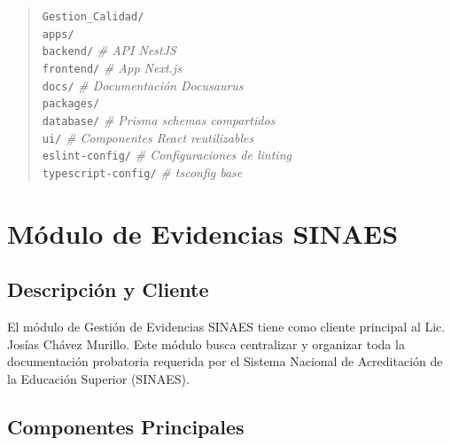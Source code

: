 \begin{quote}
\texttt{Gestion\_Calidad/}\\
\hspace*{1em}\texttt{apps/}\\
\hspace*{2em}\texttt{backend/} \hspace{2em}\textit{\# API NestJS}\\
\hspace*{2em}\texttt{frontend/} \hspace{1.5em}\textit{\# App Next.js}\\
\hspace*{2em}\texttt{docs/} \hspace{2.8em}\textit{\# Documentación Docusaurus}\\
\hspace*{1em}\texttt{packages/}\\
\hspace*{2em}\texttt{database/} \hspace{1.5em}\textit{\# Prisma schemas compartidos}\\
\hspace*{2em}\texttt{ui/} \hspace{3.3em}\textit{\# Componentes React reutilizables}\\
\hspace*{2em}\texttt{eslint-config/} \hspace{0.3em}\textit{\# Configuraciones de linting}\\
\hspace*{2em}\texttt{typescript-config/} \textit{\# tsconfig base}
\end{quote}

\section{Módulo de Evidencias SINAES}

\subsection{Descripción y Cliente}

El módulo de Gestión de Evidencias SINAES tiene como cliente principal al Lic. Josías Chávez Murillo. Este módulo busca centralizar y organizar toda la documentación probatoria requerida por el Sistema Nacional de Acreditación de la Educación Superior (SINAES).

\subsection{Componentes Principales}

